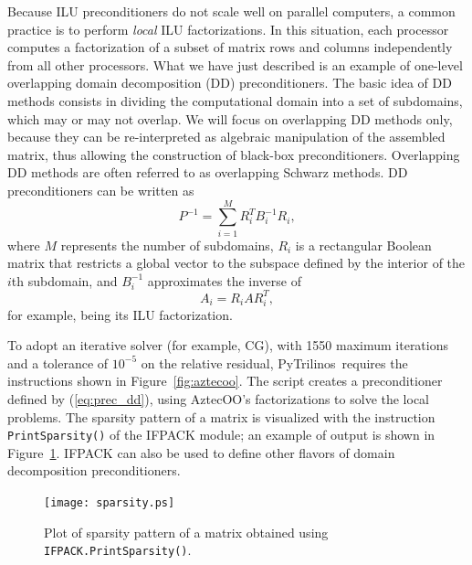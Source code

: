 \documentclass[acmtocl]{acmtrans2m}
\newcommand{\PyTrilinos}{{PyTrilinos}}
\begin{document}
Because ILU preconditioners do not scale well on parallel computers, a
common practice is to perform {\em local} ILU factorizations.  In this
situation, each processor computes a factorization of a subset of
matrix rows and columns independently from all other processors.  
What we have just described is an example of one-level overlapping
domain decomposition (DD) preconditioners.  The basic idea of DD
methods consists in dividing the computational domain into a set of
subdomains, which may or may not overlap. We will focus on overlapping
DD methods only, because they can be re-interpreted as algebraic
manipulation of the assembled matrix, thus allowing the construction
of black-box preconditioners. Overlapping DD methods are often
referred to as overlapping Schwarz methods. DD preconditioners can be
written as
\begin{equation}
  \label{eq:prec_dd}
  P^{-1} = \sum_{i=1}^M R_i^T B_i^{-1} R_i,
\end{equation}
where $M$ represents the number of subdomains, $R_i$ is a rectangular
Boolean matrix that restricts a global vector to the subspace defined
by the interior of the $i$th subdomain, and $B_i^{-1}$ approximates
the inverse of
\begin{equation}
  \label{eq:aztecoo_tilde_a}
  A_i = R_i A R_i^T,
\end{equation}
for example, being its ILU factorization.

\medskip

To adopt an iterative solver (for example, CG), with 1550 maximum
iterations and a tolerance of $10^{-5}$ on the relative residual,
\PyTrilinos\ requires the instructions shown in
Figure~\ref{fig:aztecoo}. The script creates a preconditioner defined by
(\ref{eq:prec_dd}), using AztecOO's factorizations to solve the local
problems. The sparsity pattern of a matrix is visualized with the
instruction \verb!PrintSparsity()! of the IFPACK module; an example of
output is shown in Figure~\ref{fig:sparsity}. IFPACK can also be used
to define other flavors of domain decomposition preconditioners.

\begin{figure}
  \begin{center}
    \texttt{[image: sparsity.ps]}
    \caption{Plot of sparsity pattern of a matrix obtained using
      {\tt IFPACK.PrintSparsity()}.}
    \label{fig:sparsity}
  \end{center}
\end{figure}
\end{document}

